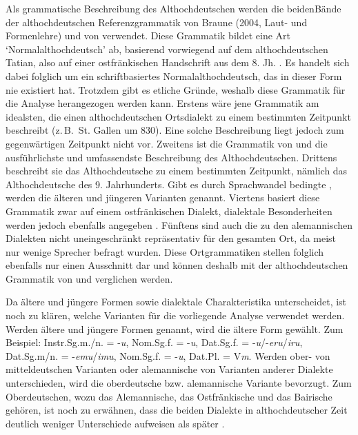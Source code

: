 Als grammatische Beschreibung des Althochdeutschen werden die beiden\linebreak Bände der althochdeutschen Referenzgrammatik von Braune (2004, Laut- und Formenlehre) und von \citet[Syntax]{Schrodt2004} verwendet. Diese Grammatik bildet eine Art ‘Normalalthochdeutsch’ ab, basierend vorwiegend auf dem althochdeutschen Tatian, also auf einer ostfränkischen Handschrift aus dem 8. Jh. \citep[6]{Braune2004}. Es handelt sich dabei folglich um ein schriftbasiertes Normalalthochdeutsch, das in dieser Form nie existiert hat. Trotzdem gibt es etliche Gründe, weshalb diese Grammatik für die Analyse herangezogen werden kann. Erstens wäre jene Grammatik am idealsten, die einen althochdeutschen Ortsdialekt zu einem bestimmten Zeitpunkt beschreibt (z.\,B.\ St. Gallen um 830). Eine solche Beschreibung liegt jedoch zum gegenwärtigen Zeitpunkt nicht vor. Zweitens ist die Grammatik von \citet{Braune2004} und \citet{Schrodt2004} die ausführlichste und umfassendste Beschreibung des Althochdeutschen. Drittens beschreibt sie das Althochdeutsche zu einem bestimmten Zeitpunkt, nämlich das Althochdeutsche des 9. Jahrhunderts. Gibt es durch Sprachwandel bedingte , werden die älteren und jüngeren Varianten genannt. Viertens basiert diese Grammatik zwar auf einem ostfränkischen Dialekt, dialektale Besonderheiten werden jedoch ebenfalls angegeben \citep[6]{Braune2004}. Fünftens sind auch die  zu den alemannischen Dialekten nicht uneingeschränkt repräsentativ für den gesamten Ort, da meist nur wenige Sprecher befragt wurden. Diese Ortgrammatiken stellen folglich ebenfalls nur einen Ausschnitt dar und können deshalb mit der althochdeutschen Grammatik von \citet{Braune2004} und \citet{Schrodt2004} verglichen werden.

Da \citet{Braune2004} ältere und jüngere Formen sowie dialektale Charakteristika unterscheidet, ist noch zu klären, welche Varianten für die vorliegende Analyse verwendet werden. Werden ältere und jüngere Formen genannt, wird die ältere Form gewählt. Zum Beispiel: Instr.Sg.m./n. = -\textit{u}, Nom.Sg.f. = -\textit{u}, Dat.Sg.f. = -\textit{u}/-\textit{eru}/\textit{iru}, Dat.Sg.m/n. = -\textit{emu}/\textit{imu}, Nom.Sg.f. = -\textit{u}, Dat.Pl. = V\textit{m}. Werden ober- von mitteldeutschen Varianten oder alemannische von Varianten anderer Dialekte unterschieden, wird die oberdeutsche bzw. alemannische Variante bevorzugt. Zum Oberdeutschen, wozu das Alemannische, das Ostfränkische und das Bairische gehören, ist noch zu erwähnen, dass die beiden Dialekte in althochdeutscher Zeit deutlich weniger Unterschiede aufweisen als später \citep[7]{Braune2004}.

